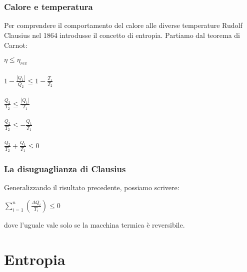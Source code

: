 \documentclass[]{beamer}
\theoremstyle{plain}
\begin{document}
\begin{frame}
\begin{columns}
\begin{column}{0.45\textwidth}
\begin{figure}
\end{figure}

\end{column}
\end{columns}
~\\~\\

\end{frame}

\begin{frame}
\frametitle{Calore e temperatura}
Per comprendere il comportamento del calore alle diverse temperature Rudolf Clausius nel 1864 introdusse il concetto di \alert<1>{entropia}.{\pause} Partiamo dal teorema di Carnot:
\begin{center}
$ \eta \leq \eta_{rev} $\\~\pause\\
$ 1- \frac{|Q_1|}{Q_2} \leq 1 - \frac{T_1}{T_2} $\\~\pause\\
$ \frac{Q_2}{T_2} \leq \frac{|Q_1|}{T_1} $\\~\pause\\ 
$ \frac{Q_2}{T_2} \leq - \frac{Q_1}{T_1} $\\~\pause\\
$ \frac{Q_2}{T_2} + \frac{Q_1}{T_1} \leq 0 $
\end{center}
\end{frame}


\begin{frame}
  \frametitle{La disuguaglianza di Clausius}
  Generalizzando il risultato precedente, possiamo scrivere:
  \begin{center}
  \colorbox{blue!30}{$ \sum\limits_{i=1}^n \left( \frac{\Delta Q_i}{T_i} \right) \leq 0 $}
  \end{center}
  dove l'uguale vale solo se la macchina termica è reversibile.

\end{frame}
\section{Entropia}
\end{document}
